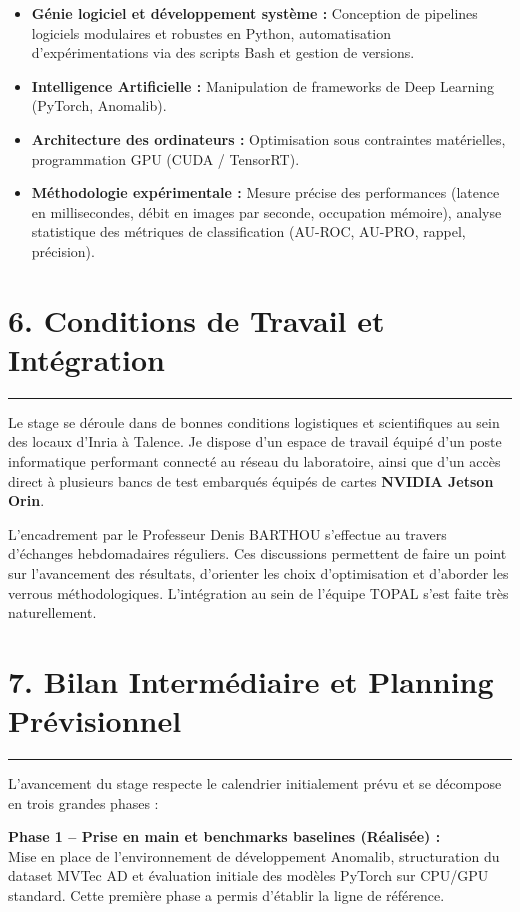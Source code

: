 \documentclass[11pt,a4paper]{article}
\begin{document}
\begin{itemize}
    \item \textbf{Génie logiciel et développement système :} Conception de pipelines logiciels modulaires et robustes en Python, automatisation d'expérimentations via des scripts Bash et gestion de versions.
    \item \textbf{Intelligence Artificielle :} Manipulation de frameworks de Deep Learning (PyTorch, Anomalib).
    \item \textbf{Architecture des ordinateurs :} Optimisation sous contraintes matérielles, programmation GPU (CUDA / TensorRT).
    \item \textbf{Méthodologie expérimentale :} Mesure précise des performances (latence en millisecondes, débit en images par seconde, occupation mémoire), analyse statistique des métriques de classification (AU-ROC, AU-PRO, rappel, précision).
\end{itemize}

\section*{\color{darkBlue} 6. Conditions de Travail et Intégration}
\hrule
\vspace{0.2cm}

Le stage se déroule dans de bonnes conditions logistiques et scientifiques au sein des locaux d'Inria à Talence. Je dispose d'un espace de travail équipé d'un poste informatique performant connecté au réseau du laboratoire, ainsi que d'un accès direct à plusieurs bancs de test embarqués équipés de cartes \textbf{NVIDIA Jetson Orin}.

L'encadrement par le Professeur Denis BARTHOU s'effectue au travers d'échanges hebdomadaires réguliers. Ces discussions permettent de faire un point sur l'avancement des résultats, d'orienter les choix d'optimisation et d'aborder les verrous méthodologiques. L'intégration au sein de l'équipe TOPAL s'est faite très naturellement.

\section*{\color{darkBlue} 7. Bilan Intermédiaire et Planning Prévisionnel}
\hrule
\vspace{0.2cm}

L'avancement du stage respecte le calendrier initialement prévu et se décompose en trois grandes phases :

\textbf{Phase 1 -- Prise en main et benchmarks baselines (Réalisée) :} \\
Mise en place de l'environnement de développement Anomalib, structuration du dataset MVTec AD et évaluation initiale des modèles PyTorch sur CPU/GPU standard. Cette première phase a permis d'établir la ligne de référence.
\end{document}
